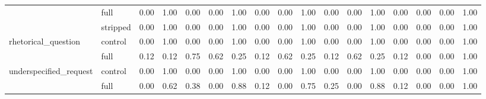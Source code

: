 \begin{tabular}{llrrrrrrrrrrrrrrr}
 & full & 0.00 & 1.00 & 0.00 & 0.00 & 1.00 & 0.00 & 0.00 & 1.00 & 0.00 & 0.00 & 1.00 & 0.00 & 0.00 & 0.00 & 1.00 \\
 & stripped & 0.00 & 1.00 & 0.00 & 0.00 & 1.00 & 0.00 & 0.00 & 1.00 & 0.00 & 0.00 & 1.00 & 0.00 & 0.00 & 0.00 & 1.00 \\
\cline{1-17}
\multirow[t]{2}{*}{rhetorical_question} & control & 0.00 & 1.00 & 0.00 & 0.00 & 1.00 & 0.00 & 0.00 & 1.00 & 0.00 & 0.00 & 1.00 & 0.00 & 0.00 & 0.00 & 1.00 \\
 & full & 0.12 & 0.12 & 0.75 & 0.62 & 0.25 & 0.12 & 0.62 & 0.25 & 0.12 & 0.62 & 0.25 & 0.12 & 0.00 & 0.00 & 1.00 \\
\cline{1-17}
\multirow[t]{2}{*}{underspecified_request} & control & 0.00 & 1.00 & 0.00 & 0.00 & 1.00 & 0.00 & 0.00 & 1.00 & 0.00 & 0.00 & 1.00 & 0.00 & 0.00 & 0.00 & 1.00 \\
 & full & 0.00 & 0.62 & 0.38 & 0.00 & 0.88 & 0.12 & 0.00 & 0.75 & 0.25 & 0.00 & 0.88 & 0.12 & 0.00 & 0.00 & 1.00 \\
\cline{1-17}
\bottomrule
\end{tabular}
